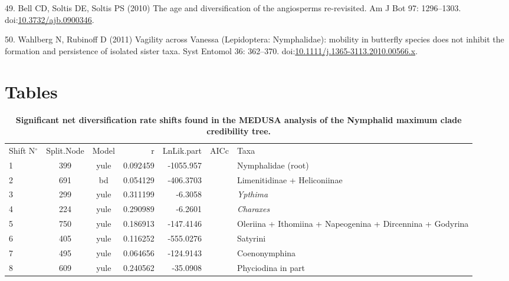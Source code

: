 \documentclass[10pt]{article}
\begin{document}
49. Bell CD, Soltis DE, Soltis PS (2010) The age and diversification of
the angiosperms re-revisited. Am J Bot 97: 1296--1303.
doi:\href{http://dx.doi.org/10.3732/ajb.0900346}{10.3732/ajb.0900346}.

50. Wahlberg N, Rubinoff D (2011) Vagility across Vanessa (Lepidoptera:
Nymphalidae): mobility in butterfly species does not inhibit the
formation and persistence of isolated sister taxa. Syst Entomol 36:
362--370.
doi:\href{http://dx.doi.org/10.1111/j.1365-3113.2010.00566.x}{10.1111/j.1365-3113.2010.00566.x}.


\section*{Tables}
\begin{table}[!h]
\caption{\bf{Significant net diversification rate shifts found in the MEDUSA analysis of the Nymphalid maximum clade credibility tree.}}
\begin{tabular}{lccrrcl}
Shift N$^\circ$ & Split.Node & Model & r          & LnLik.part & AICc     & Taxa                                                       \\
1               & 399        & yule  & 0.092459   & -1055.957  &          & Nymphalidae (root)                                         \\
2               & 691        & bd    & 0.054129   & -406.3703  &          & Limenitidinae + Heliconiinae                               \\
3               & 299        & yule  & 0.311199   & -6.3058    &          & \emph{Ypthima}                                             \\
4               & 224        & yule  & 0.290989   & -6.2601    &          & \emph{Charaxes}                                            \\
5               & 750        & yule  & 0.186913   & -147.4146  &          & Oleriina + Ithomiina + Napeogenina + Dircennina + Godyrina \\
6               & 405        & yule  & 0.116252   & -555.0276  &          & Satyrini                                                   \\
7               & 495        & yule  & 0.064656   & -124.9143  &          & Coenonymphina                                              \\
8               & 609        & yule  & 0.240562   & -35.0908   &          & Phyciodina in part                                         \\

\end{tabular}
\end{table}
\end{document}
